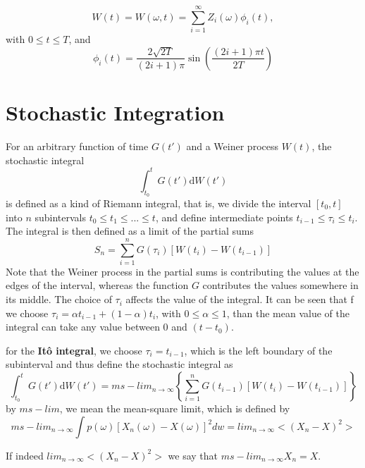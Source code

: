 \documentclass[12pt]{book}
\begin{document}
\begin{equation*}
W(t)=W(\omega,t)= \sum_{i=1}^\infty Z_i(\omega)\phi_i(t), 
\end{equation*}
with $0\leq t \leq T$, and 
\begin{equation*}
\phi_i(t) = \frac{2\sqrt{2T}}{(2i+1)\pi} \sin \left(\frac{(2i+1)\pi t}{2T} \right)
\end{equation*}

\section{Stochastic Integration}\label{section:stochasticIntegration}
For an arbitrary function of time $G(t')$ and a Weiner process $W(t)$, the stochastic integral 
\begin{equation*}
\int_{t_0}^t G(t')\mathrm{d}W(t')
\end{equation*}
is defined as a kind of Riemann integral, that is, we divide the interval $[t_0,t]$ into $n$ subintervals $t_0\leq t_1\leq ...\leq t$, and define intermediate points $t_{i-1}\leq\tau_i\leq t_{i}$. The integral is then defined as a limit of the partial sums 
\begin{equation*}
S_n=\sum_{i=1}^nG(\tau_i)[W(t_i)-W(t_{i-1})]
\end{equation*}
Note that the Weiner process in the partial sums is contributing the values at the edges of the interval, whereas the function $G$ contributes the values somewhere in its middle.
The choice of $\tau_i$ affects the value of the integral. It can be seen that f we choose $\tau_i=\alpha t_{i-1}+(1-\alpha)t_i$, with $0\leq \alpha\leq 1$,  than the mean value of the integral can take any value between 0 and $(t-t_0)$. 

for the \textbf{It\^{o} integral}, we choose $\tau_i=t_{i-1}$, which is the left boundary of the subinterval and thus define the stochastic integral as
\begin{equation*}
\int_{t_0}^{t}G(t')\mathrm{d}W(t')=ms-lim_{n\rightarrow\infty}\left\{\sum_{i=1}^nG(t_{i-1})[W(t_{i})-W(t_{i-1})] \right\}
\end{equation*}
by $ms-lim$, we mean the mean-square limit, which is defined by 
\begin{equation*}
ms-lim_{n\rightarrow\infty}\int p(\omega)[X_n(\omega)-X(\omega)]^2dw= lim_{n\rightarrow \infty}<(X_n-X)^2>
\end{equation*}

If indeed $lim_{n\rightarrow \infty}<(X_n-X)^2>$ we say that $ms-lim_{n\rightarrow \infty} X_n=X$.
\end{document}
